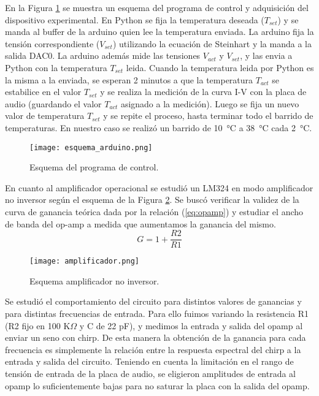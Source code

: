 \documentclass[a4paper, 11pt]{article}
\begin{document}
En la Figura \ref{fig:esquema_arduino} se muestra un esquema del programa de control y adquisición del dispositivo experimental. En Python se fija la temperatura deseada ($T_{set}$) y se manda al buffer de la arduino quien lee la temperatura enviada. La arduino fija la tensión correspondiente  ($V_{set}$) utilizando la ecuación de Steinhart y la manda a la salida DAC0. La arduino además mide las tensiones $V_{act}$ y $V_{set}$, y las envia a Python con la temperatura $T_{set}$ leida. Cuando la temperatura leida por Python es la misma a la enviada, se esperan 2 minutos  a que la temperatura $T_{act}$ se estabilice en el valor $T_{set}$ y se realiza la medición de la curva I-V con la placa de audio (guardando el valor $T_{act}$ asignado a la medición). Luego se fija un nuevo valor de temperatura  $T_{set}$ y se repite el proceso, hasta terminar todo el barrido de temperaturas. En nuestro caso se realizó un barrido de \SI{10}{\celsius}  a \SI{38}{\celsius} cada \SI{2}{\celsius}.

\begin{figure} [H]
\centering
\texttt{[image: esquema\_arduino.png]}
\caption{ Esquema del programa de control. \label{fig:esquema_arduino}}
\end{figure} 
En cuanto al amplificador operacional se estudió un LM324 en modo amplificador no inversor según el esquema de la Figura \ref{fig:amplificador}. Se buscó verificar la validez de la curva de ganancia teórica dada por la relación (\ref{eq:opamp}) y estudiar el ancho de banda del op-amp a medida que aumentamos la ganancia del mismo.
\begin{equation}\label{eq:opamp}
 G = 1 + \frac{R2}{R1}   
\end{equation}

\begin{figure} [H]
\centering
\texttt{[image: amplificador.png]}
\caption{ Esquema amplificador no inversor. \label{fig:amplificador}}
\end{figure} 
Se estudió el comportamiento del circuito para distintos valores de ganancias y para distintas frecuencias de entrada. Para ello fuimos variando la resistencia R1 (R2 fijo en 100 K$\Omega$ y C de 22 pF), y medimos la entrada y salida del opamp al enviar un seno con chirp. De esta manera la obtención de la ganancia para cada frecuencia es simplemente la relación entre la respuesta espectral del chirp a la entrada y salida del circuito. Teniendo en cuenta la limitación en el rango de tensión de entrada de la placa de audio, se eligieron amplitudes de entrada al opamp lo suficientemente bajas para no saturar la placa con la salida del opamp.
\end{document}

